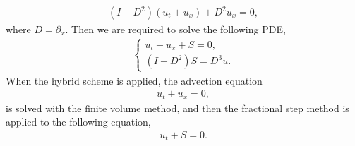 \begin{align}
(I-D^2)(u_t + u_x) +D^2u_x = 0, \label{eq:basic_2}
\end{align}
where $D=\partial_x$.
Then we are required to solve the following PDE,
\begin{align}
\left\{
\begin{array}{l}
u_t + u_x + S = 0, \\
\left(I-D^2 \right)S = D^3 u .
\end{array}
\right.
\end{align}
When the hybrid scheme is applied, the advection equation
\begin{align}
u_t + u_x = 0,
\label{eq:append_advec}
\end{align}
is solved with the finite volume method, 
and then the fractional step method is applied to
the following equation,
\begin{align*}
u_t + S = 0.
\end{align*}

